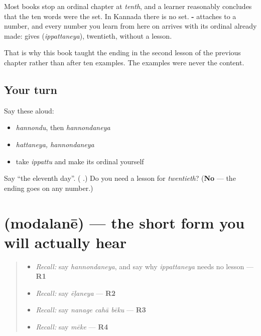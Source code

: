 \begin{grammarlens}[title={Grammar Lens: the ending is a fact about numbers, not about ten}]
Most books stop an ordinal chapter at \emph{tenth}, and a learner reasonably concludes that the ten words were the set. In Kannada there is no set. \textbf{-} attaches to a number, and every number you learn from here on arrives with its ordinal already made: \textbf{} gives \textbf{} (\emph{ippattaneya}), twentieth, without a lesson.

That is why this book taught the ending in the second lesson of the previous chapter rather than after ten examples. The examples were never the content.
\end{grammarlens}

\subsection*{Your turn}
Say these aloud:

\begin{itemize}
\raggedright
  \item \emph{hannondu}, then \emph{hannondaneya}
  \item \emph{hattaneya, hannondaneya}
  \item take \emph{ippattu} and make its ordinal yourself
\end{itemize}

\begin{tcolorbox}[breakable,colback=teal!4,colframe=teal!35!black,title={Before you move on}]
Say \textquotedblleft{}the eleventh day\textquotedblright{}. (\textbf{ }.) Do you need a lesson for \emph{twentieth}? (\textbf{No} — the ending goes on any number.)
\end{tcolorbox}
\section[\texorpdfstring{\kn{ಮೊದಲನೇ} (modalanē)}{ಮೊದಲನೇ (modalanē)}]{ (modalanē) — the short form you will actually hear}

\label{lesson:KA-C75-short-form}



\begin{quote}
\begin{itemize}
\raggedright
  \item \emph{Recall:} say \emph{hannondaneya}, and say why \emph{ippattaneya} needs no lesson — \textbf{R1}
  \item \emph{Recall:} say \emph{ēḷaneya} — \textbf{R2}
  \item \emph{Recall:} say \emph{nanage cahā bēku} — \textbf{R3}
  \item \emph{Recall:} say \emph{mēke} — \textbf{R4}
\end{itemize}
\end{quote}

